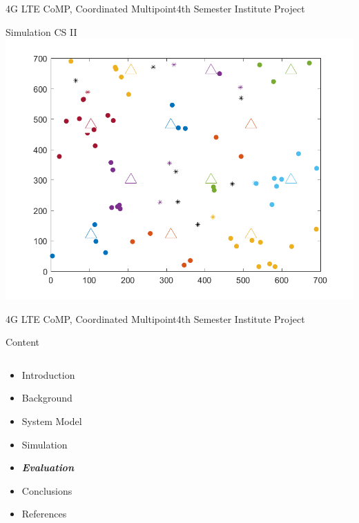 \documentclass[xcolor={cmyk}]{beamer}
\begin{document}
 \begin{frame}{4G LTE CoMP, Coordinated Multipoint}{4th Semester Institute Project}
 \begin{block}{Simulation CS II}
 \includegraphics[width=\linewidth,height=\textheight,keepaspectratio]{MapPlotCS2.png}
 \end{block}
 \end{frame}
 
\begin{frame}{4G LTE CoMP, Coordinated Multipoint}{4th Semester Institute Project}
	\begin{block}{Content}
		\begin{columns}
			\begin{column}{.9\textwidth}
				\begin{itemize}
					\item Introduction
					\item Background
					\item System Model
					\item Simulation
					\item \textbf{\emph{Evaluation}}
					\item Conclusions
					\item References
				\end{itemize}
			\end{column}
		\end{columns}
	\end{block}
\end{frame}
 
\end{document}
